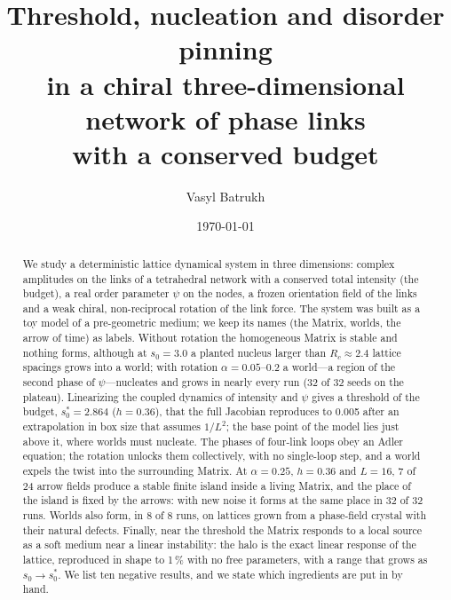 \documentclass[reprint,pre,amsmath,amssymb,superscriptaddress,nofootinbib]{revtex4-2}
\begin{document}
\title{Threshold, nucleation and disorder pinning\\ in a chiral three-dimensional network of phase links\\ with a conserved budget}

\author{Vasyl Batrukh}

\date{\today}

\begin{abstract}
We study a deterministic lattice dynamical system in three dimensions: complex amplitudes on the links of a tetrahedral network with a conserved total intensity (the budget), a real order parameter $\psi$ on the nodes, a frozen orientation field of the links and a weak chiral, non-reciprocal rotation of the link force. The system was built as a toy model of a pre-geometric medium; we keep its names (the Matrix, worlds, the arrow of time) as labels. Without rotation the homogeneous Matrix is stable and nothing forms, although at $s_0=3.0$ a planted nucleus larger than $R_c\approx2.4$ lattice spacings grows into a world; with rotation $\alpha=0.05$--0.2 a world---a region of the second phase of $\psi$---nucleates and grows in nearly every run (32 of 32 seeds on the plateau). Linearizing the coupled dynamics of intensity and $\psi$ gives a threshold of the budget, $s_0^*=2.864$ ($h=0.36$), that the full Jacobian reproduces to 0.005 after an extrapolation in box size that assumes $1/L^2$; the base point of the model lies just above it, where worlds must nucleate. The phases of four-link loops obey an Adler equation; the rotation unlocks them collectively, with no single-loop step, and a world expels the twist into the surrounding Matrix. At $\alpha=0.25$, $h=0.36$ and $L=16$, 7 of 24 arrow fields produce a stable finite island inside a living Matrix, and the place of the island is fixed by the arrows: with new noise it forms at the same place in 32 of 32 runs. Worlds also form, in 8 of 8 runs, on lattices grown from a phase-field crystal with their natural defects. Finally, near the threshold the Matrix responds to a local source as a soft medium near a linear instability: the halo is the exact linear response of the lattice, reproduced in shape to 1\,\% with no free parameters, with a range that grows as $s_0\to s_0^*$. We list ten negative results, and we state which ingredients are put in by hand.
\end{abstract}

\maketitle
\end{document}
